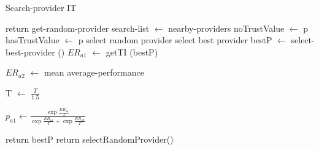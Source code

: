 
\begin{algorithm}[H]
\caption{Search-provider IT}
\begin{algorithmic} 

\STATE return get-random-provider
\ENDIF
{}
\STATE search-list $\leftarrow$ nearby-providers
\STATE noTrustValue $\leftarrow$ p
\ELSE
\STATE hasTrustValue $\leftarrow$ p
\ENDIF
\ENDFOR
{}
\RETURN select random provider
\ENDIF
{}
\RETURN select best provider
\ENDIF
\STATE bestP $\leftarrow$ select-best-provider ()
\STATE $ER_{a1}$ $\leftarrow$ getTI (bestP)

\STATE $ER_{a2}$ $\leftarrow$ mean average-performance


\STATE T $\leftarrow$ $\frac{T}{1.5}$

\STATE $p_{a1} \leftarrow \frac{\exp{\frac{ER_{a1}}{T}}}{\exp{\frac{ER_{a1}}{T}}+ \exp{\frac{ER_{a2}}{T}}}$

\STATE return bestP
\ELSE
\STATE return selectRandomProvider()
\ENDIF
\ENDIF
\end{algorithmic}
\end{algorithm}



